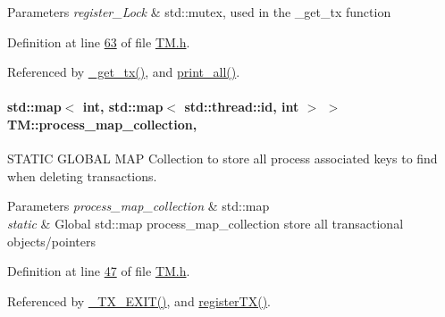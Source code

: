 \begin{DoxyParams}{Parameters}
{\em register\+\_\+\+Lock} & std\+::mutex, used in the \+\_\+get\+\_\+tx function \\
\hline
\end{DoxyParams}


Definition at line \hyperlink{_t_m_8h_source_l00063}{63} of file \hyperlink{_t_m_8h_source}{T\+M.\+h}.



Referenced by \hyperlink{_t_m_8cpp_source_l00079}{\+\_\+get\+\_\+tx()}, and \hyperlink{_t_m_8cpp_source_l00122}{print\+\_\+all()}.

\paragraph[{\texorpdfstring{process\+\_\+map\+\_\+collection}{process_map_collection}}]{\setlength{\rightskip}{0pt plus 5cm}std\+::map$<$ int, std\+::map$<$ std\+::thread\+::id, int $>$ $>$ T\+M\+::process\+\_\+map\+\_\+collection\hspace{0.3cm}{\ttfamily [static]}, {\ttfamily [private]}}\hypertarget{class_t_m_a81c3bd28ad2343a620fa070f8ac186ca_a81c3bd28ad2343a620fa070f8ac186ca}{}\label{class_t_m_a81c3bd28ad2343a620fa070f8ac186ca_a81c3bd28ad2343a620fa070f8ac186ca}


S\+T\+A\+T\+IC G\+L\+O\+B\+AL M\+AP Collection to store all process associated keys to find when deleting transactions. 


\begin{DoxyParams}{Parameters}
{\em process\+\_\+map\+\_\+collection} & std\+::map\\
\hline
{\em static} & Global std\+::map process\+\_\+map\+\_\+collection store all transactional objects/pointers \\
\hline
\end{DoxyParams}


Definition at line \hyperlink{_t_m_8h_source_l00047}{47} of file \hyperlink{_t_m_8h_source}{T\+M.\+h}.



Referenced by \hyperlink{_t_m_8cpp_source_l00102}{\+\_\+\+T\+X\+\_\+\+E\+X\+I\+T()}, and \hyperlink{_t_m_8cpp_source_l00043}{register\+T\+X()}.


